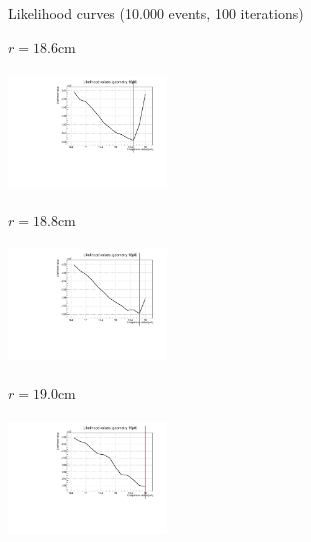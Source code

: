 \documentclass[handout,8 pt]{beamer}
\begin{document}
\begin{frame}{Likelihood curves (10.000 events, 100 iterations)}
\vspace{-5pt}
\begin{minipage}[c]{.32\textwidth}
\begin{exampleblock}{} \begin{center}$r = 18.6$cm\end{center} \end{exampleblock}
\includegraphics[width=4.2cm, height=3.2cm]{figs/likelihood100LowStat/likelihood18p6.pdf} 
\end{minipage}
\begin{minipage}[c]{.32\textwidth}
\begin{exampleblock}{} \begin{center}$r = 18.8$cm\end{center} \end{exampleblock}
\includegraphics[width=4.2cm, height=3.2cm]{figs/likelihood100LowStat/likelihood18p8.pdf} 
\end{minipage}
\begin{minipage}[c]{.32\textwidth}
\begin{exampleblock}{} \begin{center}$r = 19.0$cm\end{center} \end{exampleblock}
\includegraphics[width=4.2cm, height=3.2cm]{figs/likelihood100LowStat/likelihood19p0.pdf} 
\end{minipage}
\end{frame}
\end{document}
